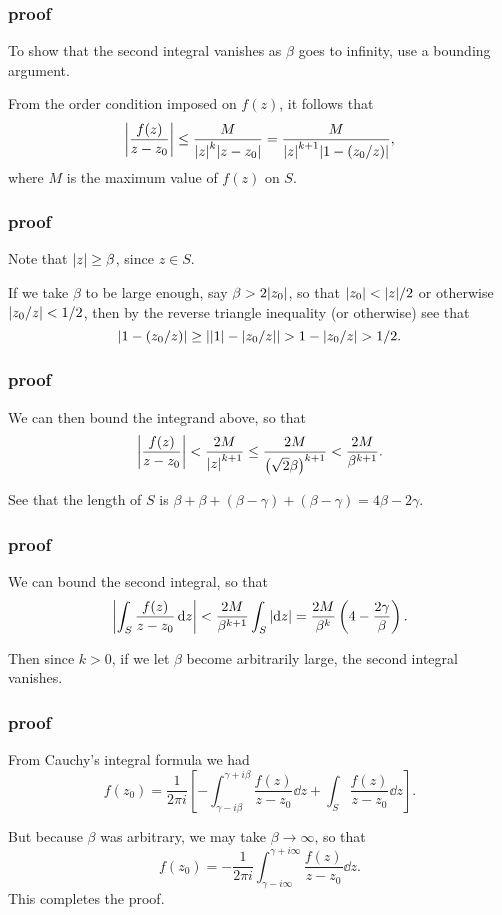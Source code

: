 \documentclass[mathserif]{beamer}
\newcommand{\br}[1]{\left(#1\right)}
\newcommand{\sbr}[1]{\left[#1\right]}
\begin{document}
\begin{frame}
  \frametitle{proof}

  To show that the second integral vanishes as $\beta$ goes to infinity, use a bounding argument. %
  
  \pause From the order condition imposed on $f(z)$, it follows that \[\abs{\frac{f(z)}{z-z_0}} \leq \frac{M}{\abs{z}^k\abs{z-z_0}} = \frac{M}{\abs{z}^{k+1}\abs{1-(z_0/z)}},\] where $M$ is the maximum value of $f(z)$ on $S$.

\end{frame}

\begin{frame}
  \frametitle{proof}

  Note that $\abs{z}\geq \beta$, since $z\in S$.
  
  \pause If we take $\beta$ to be large enough, say $\beta > 2\abs{z_0}$, so that $\abs{z_0} < \abs{z}/2$ or otherwise $\abs{z_0/z} < 1/2$, then by the reverse triangle inequality (or otherwise) see that \[\abs{1-(z_0/z)}\geq \abs{\abs{1}-\abs{z_0/z}} > 1-\abs{z_0/z} > 1/2.\]


  

\end{frame}

\begin{frame}
  \frametitle{proof}

  We can then bound the integrand above, so that \[\abs{\frac{f(z)}{z-z_0}} < \frac{2M}{\abs{z}^{k+1}} \leq \frac{2M}{\br{\sqrt{2}\beta}^{k+1}} < \frac{2M}{\beta^{k+1}}.\]

  \pause See that the length of $S$ is $\beta + \beta + (\beta-\gamma) + (\beta-\gamma) = 4\beta-2\gamma$.

\end{frame}

\begin{frame}
  \frametitle{proof}

  We can bound the second integral, so that \[\abs{\int_S\frac{f(z)}{z-z_0}\dd{z}} < \frac{2M}{\beta^{k+1}}\int_S \abs{\dd{z}} = \frac{2M}{\beta^k}\br{4-\frac{2\gamma}{\beta}}.\]
  
  \pause Then since $k>0$, if we let $\beta$ become arbitrarily large, the second integral vanishes. 

\end{frame}

\begin{frame}
  \frametitle{proof}

  From Cauchy's integral formula we had \[f(z_0) = \frac{1}{2\pi i}\sbr{-\int_{\gamma-i\beta}^{\gamma + i\beta}\frac{f(z)}{z-z_0}\dd{z} + \int_S\frac{f(z)}{z-z_0}\dd{z}}.\]
  
  \pause But because $\beta$ was arbitrary, we may take $\beta\to\infty$, so that \[f(z_0) = -\frac{1}{2\pi i}\int_{\gamma-i\infty}^{\gamma + i\infty}\frac{f(z)}{z-z_0}\dd{z}.\] This completes the proof.

\end{frame}
\end{document}
